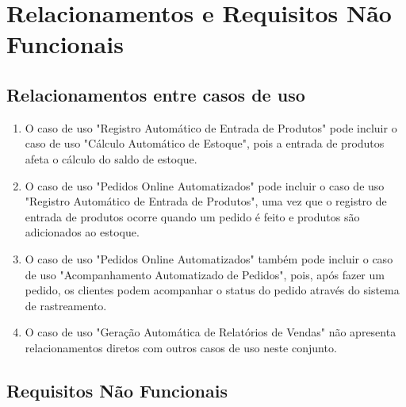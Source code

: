 \documentclass[
	12pt,				%
	openright,			%
	twoside,			%
	a4paper,			%
	english,			%
	brazil				%
	]{abntex2}
\begin{document}
\chapter{Relacionamentos e Requisitos Não Funcionais}\label{rel_e_requi_NF}

\section{Relacionamentos entre casos de uso}\label{rel_entre_casos}

\begin{enumerate}
	\item O caso de uso "Registro Automático de Entrada de Produtos" pode incluir o caso de uso "Cálculo Automático de Estoque", pois a entrada de produtos afeta o cálculo do saldo de estoque.
	\item O caso de uso "Pedidos Online Automatizados" pode incluir o caso de uso "Registro Automático de Entrada de Produtos", uma vez que o registro de entrada de produtos ocorre quando um pedido é feito e produtos são adicionados ao estoque.
	\item O caso de uso "Pedidos Online Automatizados" também pode incluir o caso de uso "Acompanhamento Automatizado de Pedidos", pois, após fazer um pedido, os clientes podem acompanhar o status do pedido através do sistema de rastreamento.
	\item O caso de uso "Geração Automática de Relatórios de Vendas" não apresenta relacionamentos diretos com outros casos de uso neste conjunto.
\end{enumerate}

\section{Requisitos Não Funcionais }\label{req_n_func}
\end{document}
